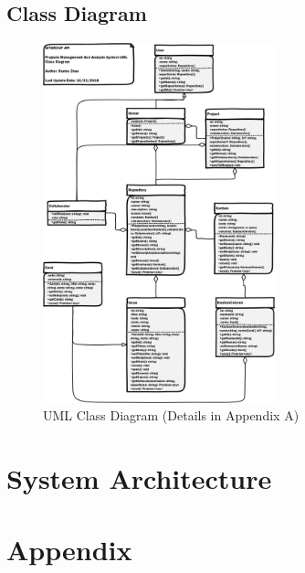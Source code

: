 \documentclass[12pt,a4paper]{report}
\begin{document}
\section{Class Diagram}
\begin{figure}[H]
	\centering
	\includegraphics[width=0.6\textwidth]{./pics/ClassDiagram.png}
	\caption{UML Class Diagram (Details in Appendix A)}
\end{figure}


\chapter{System Architecture}


\cleardoublepage
\appendix
\chapter{Appendix}%
\end{document}
